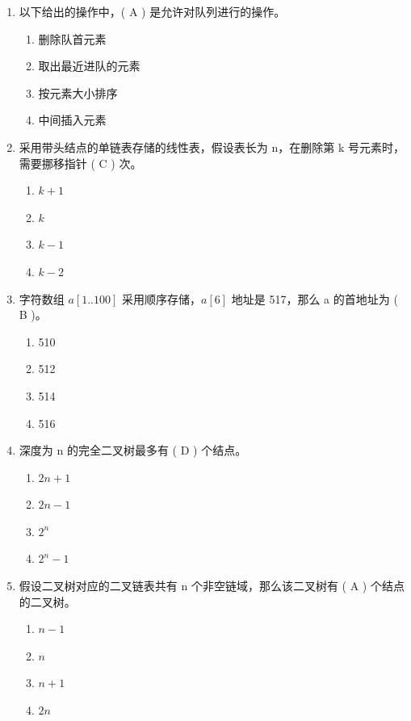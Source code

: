 \documentclass[12pt, a4paper]{article}
\begin{document}
\begin{enumerate}[label=\arabic*.]
    \item 以下给出的操作中，( A ) 是允许对队列进行的操作。
    \begin{enumerate}
        \item 删除队首元素
        \item 取出最近进队的元素
        \item 按元素大小排序
        \item 中间插入元素
    \end{enumerate}

    \item 采用带头结点的单链表存储的线性表，假设表长为 n，在删除第 k 号元素时，需要挪移指针 ( C ) 次。
    \begin{enumerate}
        \item $k+1$
        \item $k$
        \item $k-1$
        \item $k-2$
    \end{enumerate}

    \item 字符数组 $a[1..100]$ 采用顺序存储，$a[6]$ 地址是 517，那么 a 的首地址为 ( B )。
    \begin{enumerate}
        \item 510
        \item 512
        \item 514
        \item 516
    \end{enumerate}

    \item 深度为 n 的完全二叉树最多有 ( D ) 个结点。
    \begin{enumerate}
        \item $2n+1$
        \item $2n-1$
        \item $2^n$
        \item $2^n-1$
    \end{enumerate}

    \item 假设二叉树对应的二叉链表共有 n 个非空链域，那么该二叉树有 ( A ) 个结点的二叉树。
    \begin{enumerate}
        \item $n-1$
        \item $n$
        \item $n+1$
        \item $2n$
    \end{enumerate}


\end{enumerate}
\end{document}
